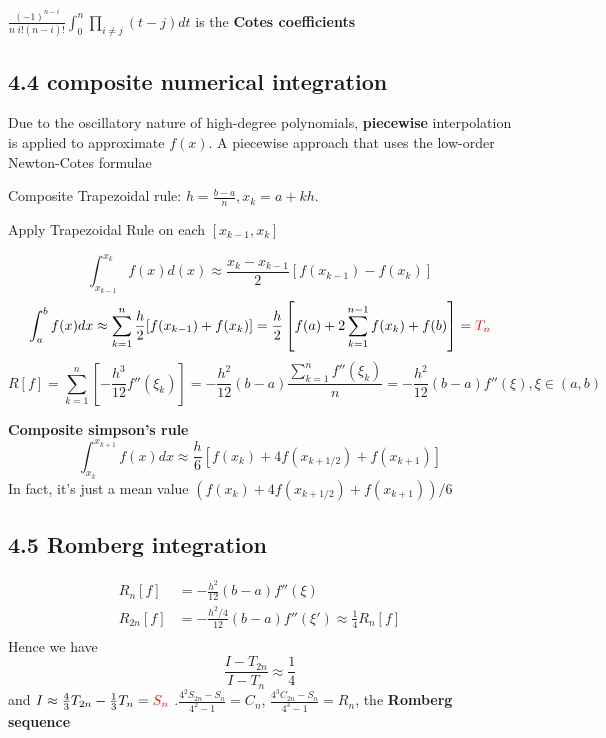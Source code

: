 \documentclass[11pt]{article}
\begin{document}
\(\frac{(-1)^{n-i}}{n\;i!(n-i)!}\int_0^n\displaystyle\prod_{i\neq j}(t-j)dt\)
is the \textbf{Cotes coefficients}

\subsection{4.4 composite numerical integration}
\label{sec:org19e4689}
Due to the oscillatory nature of high-degree polynomials, \textbf{piecewise}
interpolation is applied to approximate \(f(x)\). A piecewise approach that
uses the low-order Newton-Cotes formulae


Composite Trapezoidal rule: \(h=\frac{b-a}{n}, x_k=a+kh\).

Apply Trapezoidal Rule on each \([x_{k-1}, x_k]\)

\begin{equation*}
\int_{x_{k-1}}^{x_k}f(x)d(x)\approx \frac{x_k-x_{k-1}}{2}[f(x_{k-1})-f(x_k)]
\end{equation*}
\begin{equation*}
\int_a^bf(x)dx\approx \displaystyle\sum_{k=1}^n\frac{h}{2}[f(x_{k-1})+f(x_k)]=
\frac{h}{2}\left[f(a)+2 \displaystyle\sum_{k=1}^{n-1}f(x_k)+f(b)\right]=
\textcolor{red}{T_n} 
\end{equation*}
\begin{equation*}
R[f]=\displaystyle\sum_{k=1}^n\left[-\frac{h^3}{12}f''(\xi_k)\right]=-\frac{h^2}
{12}(b-a)\frac{\displaystyle\sum_{k=1}^nf''(\xi_k)}{n}=
-\frac{h^2}{12}(b-a)f''(\xi),\xi\in(a,b)
\end{equation*}


\textbf{Composite simpson's rule}
\begin{equation*}
\int_{x_k}^{x_{k+1}}f(x)dx\approx\frac{h}{6}\left[f(x_k)+4f(x_{k+1/2})+f(x_{k+1})\right]
\end{equation*}
In fact, it's just a mean value \((f(x_k)+4f(x_{k+1/2})+f(x_{k+1})) / 6\)

\subsection{4.5 Romberg integration}
\label{sec:org70ef15c}
\begin{align*}
R_n[f]&=-\frac{h^2}{12}(b-a)f''(\xi)\\
R_{2n}[f]&=-\frac{h^2/4}{12}(b-a)f''(\xi')\approx \frac{1}{4}R_n[f]\\
\end{align*}
Hence we have
\begin{equation*}
\frac{I-T_{2n}}{I-T_n}\approx\frac{1}{4}
\end{equation*}
and \(I\approx \frac{4}{3}T_{2n}-\frac{1}{3}T_n=\textcolor{red}{S_n}\)
.\(\frac{4^2S_{2n}-S_n}{4^2-1}=C_n\), \(\frac{4^3C_{2n}-S_n}{4^3-1}=R_n\), the
\textbf{Romberg sequence}
\end{document}
